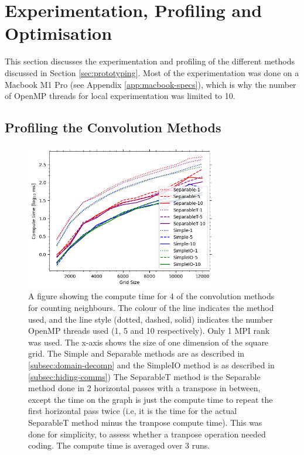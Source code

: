 
\section{Experimentation, Profiling and Optimisation}\label{sec:profiling}
    This section discusses the experimentation and profiling of the different methods discussed in Section \eqref{sec:prototyping}.
    Most of the experimentation was done on a Macbook M1 Pro (see Appendix \eqref{app:macbook-specs}), which is why the number of OpenMP threads for local
    experimentation was limited to 10.
    \subsection{Profiling the Convolution Methods}\label{subsec:prof-conv}
    \begin{figure}[htb]
    \centering
    \includegraphics[width=0.75\textwidth]{./figures/convolutions}
    \caption{A figure showing the compute time for 4 of the convolution methods for counting neighbours.
        The colour of the line indicates the method used, and the line style (dotted, dashed, solid) indicates the number
        OpenMP threads used (1, 5 and 10 respectively).
        Only 1 MPI rank was used.
        The x-axis shows the size of one dimension of the square grid.
        The Simple and Separable methods are as described in \eqref{subsec:domain-decomp} and the SimpleIO method is
        as described in \eqref{subsec:hiding-comms})
        The SeparableT method is the Separable method done in 2 horizontal passes with a transpose in between, except
        the time on the graph is just the compute time to repeat the first horizontal pass twice (i.e, it is the time
        for the actual SeparableT method minus the tranpose compute time).
        This was done for simplicity, to assess whether a tranpose operation needed coding.
        The compute time is averaged over 3 runs.}
    \label{fig:convolutions}
    \end{figure}

